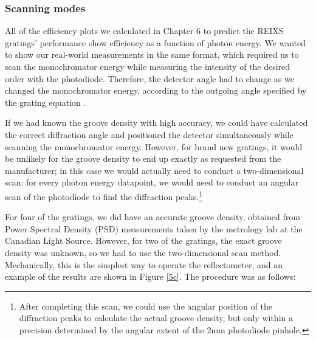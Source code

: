 \subsubsection{Scanning modes}
All of the efficiency plots we calculated in Chapter 6 to predict the REIXS gratings' performance show efficiency as a function of photon energy.  We wanted to show our real-world measurements in the same format, which required us to scan the monochromator energy while measuring the intensity of the desired order with the photodiode.  Therefore, the detector angle had to change as we changed the monochromator energy, according to the outgoing angle specified by the grating equation .  

If we had known the groove density with high accuracy, we could have calculated the correct diffraction angle and positioned the detector simultaneously while scanning the monochromator energy.  However, for brand new gratings, it would be unlikely for the groove density to end up exactly as requested from the manufacturer; in this case we would actually need to conduct a two-dimensional scan: for every photon energy datapoint, we would need to conduct an angular scan of the photodiode to find the diffraction peaks.\footnote{After completing this scan, we could use the angular position of the diffraction peaks to calculate the actual groove density, but only within a precision determined by the angular extent of the 2mm photodiode pinhole.}

For four of the gratings, we did have an accurate groove density, obtained from Power Spectral Density (PSD) measurements taken by the metrology lab at the Canadian Light Source.  However, for two of the gratings, the exact groove density was unknown, so we had to use the two-dimensional scan method.  Mechanically, this is the simplest way to operate the reflectometer, and an example of the results are shown in Figure \ref{5c}.  The procedure was as follows:

